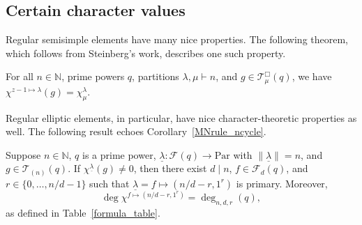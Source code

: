 \documentclass[Unicode,ALCO]{cedram}
\newcommand{\CF}{\mathcal{F}}
\newcommand{\N}{\mathbb{N}}
\newcommand{\CT}{\mathcal{T}}
\newcommand{\Par}{\text{Par}}
\newcommand{\ulambda}{{\underline{\lambda}}}
\begin{document}
\subsection{Certain character values}

Regular semisimple elements have many nice properties. The following theorem, which follows from Steinberg's work, describes one such property.
\begin{theorem}
\label{sn_stuff}
For all \(n \in \N\), prime powers \(q\), partitions \(\lambda, \mu \vdash n\), and \(g \in \CT_\mu^\Box (q)\), we have \(\chi^{z-1 \mapsto \lambda} (g) = \chi^\lambda_\mu\).
\end{theorem}

Regular elliptic elements, in particular, have nice character-theoretic properties as well.
The following result echoes Corollary~\ref{MNrule_ncycle}.
\begin{corollary}
\label{reg_ell_chi}
Suppose \(n \in \N\), \(q\) is a prime power, \(\ulambda : \CF(q) \to \Par\) with \(\|\ulambda\| = n\), and \(g \in \CT_{(n)} (q)\).
If \(\chi^\ulambda (g) \neq 0\), then there exist \(d \mid n\), \(f \in \CF_d (q)\), and \(r \in \{0,\ldots,n/d-1\}\) such that \(\ulambda = f \mapsto (n/d - r, 1^r)\) is primary.
Moreover,
\begin{equation}
\deg \chi^{f \mapsto (n/d-r,1^r)} = \deg_{n,d,r} (q),
\end{equation}
as defined in Table~\ref{formula_table}.
\end{corollary}
\end{document}
